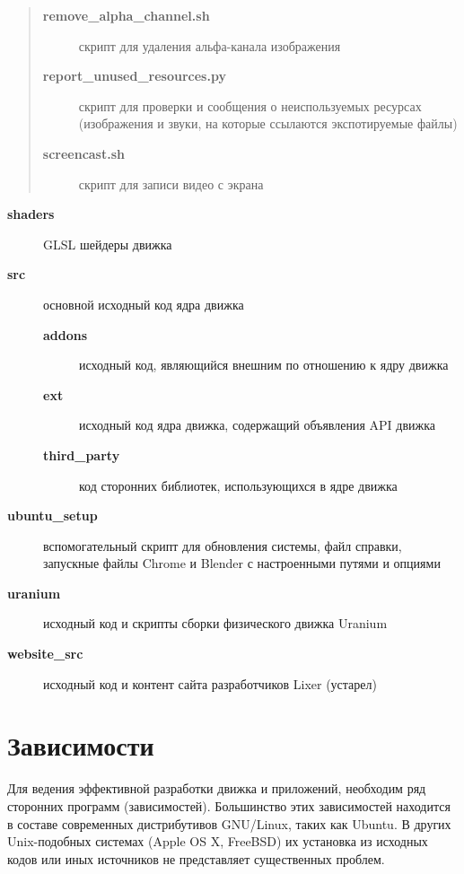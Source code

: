 \documentclass[a4paper,12pt,oneside]{sphinxmanual}
\begin{document}
\begin{quote}
\begin{description}
\item[{\textbf{remove\_alpha\_channel.sh}}] \leavevmode
скрипт для удаления альфа-канала изображения

\item[{\textbf{report\_unused\_resources.py}}] \leavevmode
скрипт для проверки и сообщения о неиспользуемых ресурсах (изображения и
звуки, на которые ссылаются экспотируемые файлы)

\item[{\textbf{screencast.sh}}] \leavevmode
скрипт для записи видео с экрана

\end{description}
\end{quote}
\begin{description}
\item[{\textbf{shaders}}] \leavevmode
GLSL шейдеры движка

\item[{\textbf{src}}] \leavevmode
основной исходный код ядра движка
\begin{description}
\item[{\textbf{addons}}] \leavevmode
исходный код, являющийся внешним по отношению к ядру движка

\item[{\textbf{ext}}] \leavevmode
исходный код ядра движка, содержащий объявления API движка

\item[{\textbf{third\_party}}] \leavevmode
код сторонних библиотек, использующихся в ядре движка

\end{description}

\item[{\textbf{ubuntu\_setup}}] \leavevmode
вспомогательный скрипт для обновления системы, файл справки, запускные файлы Chrome и Blender с настроенными путями и опциями

\item[{\textbf{uranium}}] \leavevmode
исходный код и скрипты сборки физического движка Uranium

\item[{\textbf{website\_src}}] \leavevmode
исходный код и контент сайта разработчиков Lixer (устарел)

\end{description}


\section{Зависимости}
\label{developers:id6}\label{developers:dependencies}
Для ведения эффективной разработки движка и приложений, необходим ряд сторонних
программ (зависимостей). Большинство этих зависимостей находится в составе
современных дистрибутивов GNU/Linux, таких как Ubuntu. В других Unix-подобных
системах (Apple OS X, FreeBSD) их установка из исходных кодов или иных
источников не представляет существенных проблем.
\end{document}
